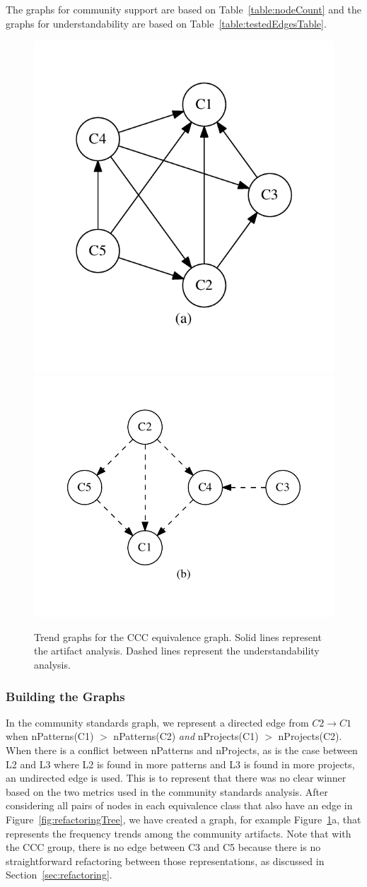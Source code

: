 The graphs for community support are based on Table~\ref{table:nodeCount} and the graphs for understandability are based on Table~\ref{table:testedEdgesTable}.

\begin{figure}[tb]
\centering
\includegraphics[width=0.42\columnwidth]{graphs/cart.pdf}\includegraphics[width=0.57\columnwidth]{graphs/ccom.pdf}
\caption{Trend graphs for the CCC equivalence graph. Solid lines represent the artifact analysis. Dashed lines represent the understandability analysis.}
\label{fig:graphsforanalysis}
\end{figure}

\subsubsection{Building the Graphs}
In the community standards graph, we represent a directed edge from $C2 \rightarrow C1$ when  nPatterns(C1) $>$ nPatterns(C2) \emph{and}  nProjects(C1) $>$ nProjects(C2).
When there is a conflict between nPatterns and nProjects, as is the case between L2 and L3 where L2 is found in more patterns and L3 is found in more projects, an undirected edge is used.
This is to represent that there was no clear winner based on the two metrics used in the community standards analysis.
After considering all pairs of nodes in each equivalence class that also have an edge in Figure~\ref{fig:refactoringTree}, we have created a graph, for example Figure~\ref{fig:graphsforanalysis}a, that represents the frequency trends among the community artifacts. Note that with the CCC group, there is no edge between C3 and C5 because there is no straightforward refactoring between those representations, as discussed in Section~\ref{sec:refactoring}.

